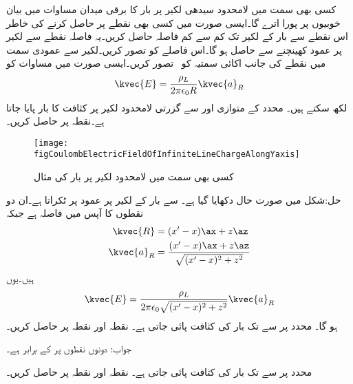 کسی بھی سمت میں لامحدود سیدھی لکیر پر بار کا برقی میدان مساوات  میں بیان خوبیوں پر پورا اترے گا۔ایسی صورت میں کسی بھی نقطے پر  حاصل کرنے کی خاطر اس نقطے سے بار کے لکیر تک کم سے کم فاصلہ  حاصل کریں۔یہ فاصلہ نقطے سے لکیر پر عمود کھینچنے سے حاصل ہو گا۔اس فاصلے کو  تصور کریں۔لکیر سے عمودی سمت میں نقطے کی جانب اکائی سمتیہ  کو \arho   \, تصور کریں۔ایسی صورت میں مساوات  کو
\begin{align}\label{مساوات_کولمب_کسی_بھِی_سمت_میں_لامحدود_لکیر_رداسی_میدان_پیدا_کرتا_ہے}
\kvec{E}=\frac{\rho_L }{2 \pi \epsilon_0 R} \kvec{a}_R
\end{align}
لکھ سکتے ہیں۔
 محدد کے  متوازی اور  سے گزرتی لامحدود لکیر پر  کثافت کا بار پایا جاتا ہے۔نقطہ  پر  حاصل کریں۔
\begin{figure}
\centering
\texttt{[image: figCoulombElectricFieldOfInfiniteLineChargeAlongYaxis]}
\caption{کسی بھی سمت میں لامحدود لکیر پر بار کی مثال}
\label{شکل_کولمب_کسی_بھی_سمت_لامحدود_لکیر_پر_بار_کا_میدان}
\end{figure}

حل:شکل  میں صورت حال دکھایا گیا ہے۔ سے بار کے لکیر پر عمود  پر ٹکراتا ہے۔ان دو نقطوں کا آپس میں فاصلہ  ہے جبکہ 
\begin{align*}
\kvec{R}&=(x'-x)\ax+z\az\\
\kvec{a}_R&=\frac{(x'-x)\ax+z\az}{\sqrt{(x'-x)^2+z^2}}
\end{align*}
ہیں۔یوں
\begin{align*}
\kvec{E}=\frac{\rho_L}{2 \pi \epsilon_0 \sqrt{(x'-x)^2+z^2}} \kvec{a}_R
\end{align*}
ہو گا۔
 محدد پر  سے  تک  بار کی کثافت پائی جاتی ہے۔ نقطہ  اور نقطہ    پر  حاصل کریں۔

جواب: دونوں نقطوں پر  کے برابر ہے۔

 محدد پر  سے  تک  بار کی کثافت پائی جاتی ہے۔ نقطہ  اور نقطہ
    پر  حاصل کریں۔

